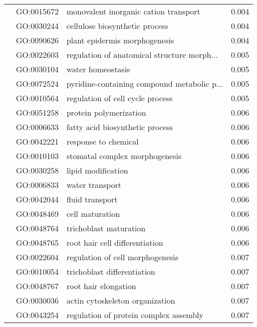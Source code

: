 \begin{longtable}{lllr}
   & GO:0015672 &        monovalent inorganic cation transport &         0.004 \\
   & GO:0030244 &               cellulose biosynthetic process &         0.004 \\
   & GO:0090626 &                plant epidermis morphogenesis &         0.004 \\
   & GO:0022603 &  regulation of anatomical structure morph... &         0.005 \\
   & GO:0030104 &                            water homeostasis &         0.005 \\
   & GO:0072524 &  pyridine-containing compound metabolic p... &         0.005 \\
   & GO:0010564 &             regulation of cell cycle process &         0.005 \\
   & GO:0051258 &                       protein polymerization &         0.006 \\
   & GO:0006633 &              fatty acid biosynthetic process &         0.006 \\
   & GO:0042221 &                         response to chemical &         0.006 \\
   & GO:0010103 &               stomatal complex morphogenesis &         0.006 \\
   & GO:0030258 &                           lipid modification &         0.006 \\
   & GO:0006833 &                              water transport &         0.006 \\
   & GO:0042044 &                              fluid transport &         0.006 \\
   & GO:0048469 &                              cell maturation &         0.006 \\
   & GO:0048764 &                       trichoblast maturation &         0.006 \\
   & GO:0048765 &               root hair cell differentiation &         0.006 \\
   & GO:0022604 &             regulation of cell morphogenesis &         0.007 \\
   & GO:0010054 &                  trichoblast differentiation &         0.007 \\
   & GO:0048767 &                         root hair elongation &         0.007 \\
   & GO:0030036 &              actin cytoskeleton organization &         0.007 \\
   & GO:0043254 &       regulation of protein complex assembly &         0.007 \\

\end{longtable}
